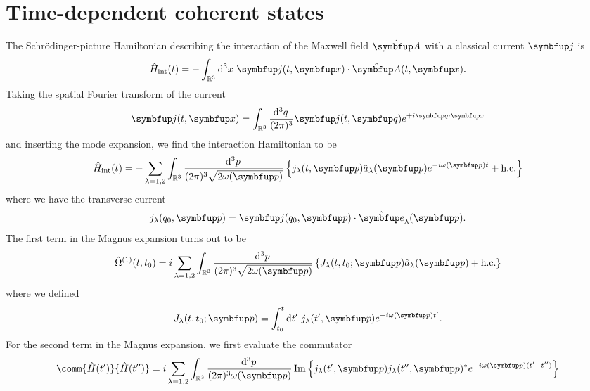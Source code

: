 \section{Time-dependent coherent states}

The Schrödinger-picture Hamiltonian describing the interaction of the Maxwell field $\vu{A}$ with a classical current $\vb{j}$ is
\begin{equation}
	\hat{H}_\text{int}(t)
	=
	-
	\int_{\mathbb{R}^3}\dd[3]{x}
	\vb{j}(t,\vb{x})
	\vdot
	\hat{\vb{A}}(t,\vb{x})
	.
\end{equation}
Taking the spatial Fourier transform of the current
\begin{equation}
	\vb{j}(t,\vb{x})
	=
	\int_{\mathbb{R}^3}\frac{\dd[3]{q}}{(2\pi)^3}
	\vb{j}(t,\vb{q})
	e^{+i\vb{q}\vdot\vb{x}}
\end{equation}
and inserting the mode expansion, we find the interaction Hamiltonian to be
\begin{equation}
	\hat{H}_\text{int}(t)
	=
	-
	\sum_{\lambda=1,2}
	\int_{\mathbb{R}^3}\frac{\dd[3]{p}}{(2\pi)^3\sqrt{2\omega(\vb{p})}}
	\left\{
		j_\lambda(t,\vb{p})
		\hat{a}_\lambda(\vb{p})
		e^{-i\omega(\vb{p})t}
		+
		\text{h.c.}
	\right\}
\end{equation}
where we have the transverse current
\begin{equation}
	j_\lambda(q_0,\vb{p})
	=
	\vb{j}(q_0,\vb{p})
	\vdot
	\vu{e}_\lambda(\vb{p})
	.
\end{equation}
The first term in the Magnus expansion turns out to be
\begin{equation}
	\hat{\Omega}^{(1)}(t,t_0)
	=
	i
	\sum_{\lambda=1,2}
	\int_{\mathbb{R}^3}\frac{\dd[3]{p}}{(2\pi)^3\sqrt{2\omega(\vb{p})}}
	\left\{
		J_\lambda(t,t_0;\vb{p})
		\hat{a}_\lambda(\vb{p})
		+
		\text{h.c.}
	\right\}
\end{equation}
where we defined
\begin{equation}
	J_\lambda(t,t_0;\vb{p})
	=
	\int_{t_0}^t\dd{t^\prime}
	j_\lambda(t^\prime,\vb{p})
	e^{-i\omega(\vb{p})t^\prime}
	.
\end{equation}
For the second term in the Magnus expansion, we first evaluate the commutator
\begin{equation}
	\comm{\hat{H}(t^\prime)}{\hat{H}(t^{\prime\prime})}
	=
	i\sum_{\lambda=1,2}
	\int_{\mathbb{R}^3}\frac{\dd[3]{p}}{(2\pi)^3\omega(\vb{p})}
	\Im\left\{
		j_\lambda(t^\prime,\vb{p})
		j_\lambda(t^{\prime\prime},\vb{p})^*
		e^{-i\omega(\vb{p})(t^\prime-t^{\prime\prime})}
	\right\}
\end{equation}
